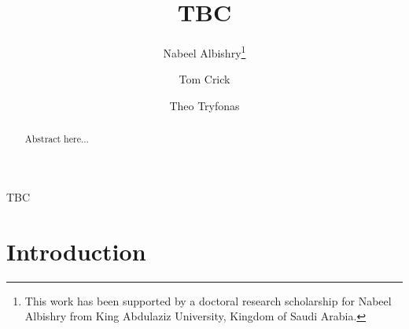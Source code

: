 \documentclass{llncs}
\begin{document}
\title{TBC}

\author{Nabeel Albishry\thanks{This work has been supported by a doctoral research scholarship for
Nabeel Albishry from King Abdulaziz University, Kingdom of Saudi
Arabia.} \and Tom
  Crick \and Theo Tryfonas}



\maketitle

\begin{abstract}
Abstract here...
 \end{abstract}

\begin{keywords}
TBC
\end{keywords}

\section{Introduction}\label{intro}






\end{document}
